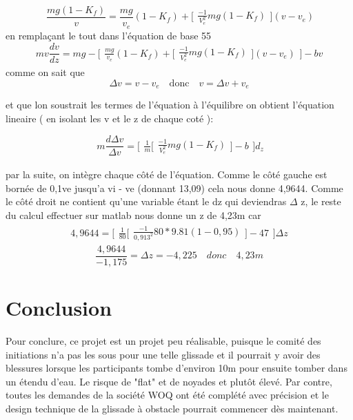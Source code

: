 \documentclass{article}
\begin{document}
\begin{equation}
\ \frac{mg ( 1- K_{f})}{v} = \frac{mg}{v_{e}}(1-K_{f})+
\Bigg[\begin{array}{cc}
    \frac{-1}{V_{e}^2}mg(1-K_{f})
    \end{array}\Bigg]
    (v-v_{e})
\end{equation}
en remplaçant le tout dans l'équation de base 55
\begin{equation}
mv \frac{dv}{dz} = mg - \Bigg[\begin{array}{cc}
\frac{mg}{v_{e}}(1-K_{f})+
\Bigg[\begin{array}{cc}
    \frac{-1}{V_{e}^2}mg(1-K_{f})
    \end{array}\Bigg]
    (v-v_{e}) \end{array}\Bigg] - bv
\end{equation}
comme on sait que
\begin{equation}
\Delta v = v - v_{e}  \quad  \textrm{donc} \quad    v = \Delta v+ v_{e}
\end{equation}

et que lon soustrait les termes de l'équation à l'équilibre on obtient l'équation lineaire  ( en isolant les v et le z de chaque coté ):

\begin{equation}
\ m \frac{d \Delta v}{\Delta v}= \Bigg[\begin{array}{cc} \frac{1}{m} \Bigg[\begin{array}{cc}
    \frac{-1}{V_{e}^2}mg(1-K_{f})
    \end{array}\Bigg]  - b\end{array}\Bigg] d_{z}
\end{equation}

par la suite, on intègre chaque côté de l'équation. Comme le côté gauche est bornée de 0,1ve jusqu'a vi - ve  (donnant 13,09)  cela nous donne 4,9644. Comme le côté droit ne contient qu'une variable étant le dz qui deviendras $\Delta$ z, le reste du calcul effectuer sur matlab nous donne un z de 4,23m car 
 \begin{equation}
 4,9644 = \Bigg[\begin{array}{cc} \frac{1}{80} \Bigg[\begin{array}{cc}
    \frac{-1}{0,913^2}80*9.81(1-0,95)
    \end{array}\Bigg]  - 47\end{array}\Bigg] \Delta z
 \end{equation}
 \begin{equation}
 \frac{4,9644}{ -1,175}= \Delta z = -4,225 \quad donc \quad 4,23 m
 \end{equation}
 \section{Conclusion}
Pour conclure, ce projet est un projet peu réalisable, puisque le comité des initiations n'a pas les sous pour une telle glissade et il pourrait y avoir des blessures lorsque les participants tombe d'environ 10m pour ensuite tomber dans un étendu d'eau. Le risque de "flat" et de noyades et plutôt élevé. Par contre, toutes les demandes de la société WOQ ont été complété avec précision et le design technique de la glissade à obstacle pourrait commencer dès maintenant.
\end{document}
